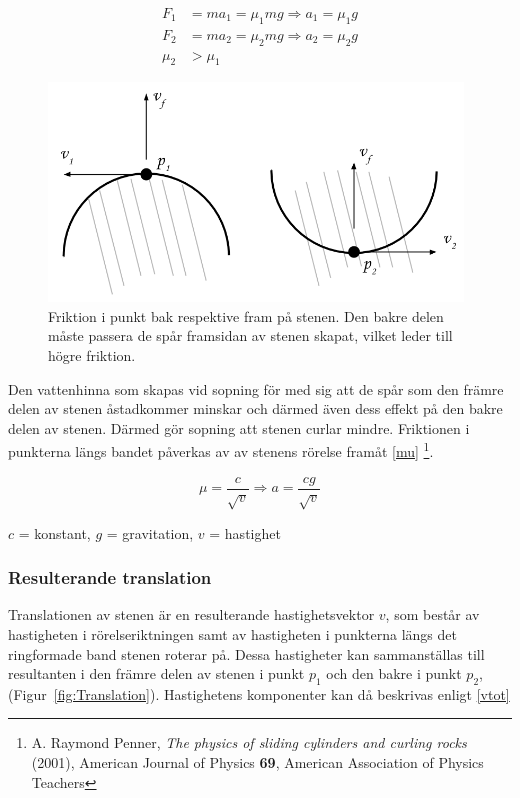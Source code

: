 \documentclass[11pt]{article} %
\begin{document}
 \begin{align}\label{Fsida1}
 F_1& = ma_1 = \mu_1 mg \Rightarrow a_1 = \mu_1 g \\\label{Fsida2}
 F_2& = ma_2 = \mu_2 mg \Rightarrow a_2 = \mu_2g \\\label{biggerthan}
 \mu_2& > \mu_1
 \end{align}

\begin{figure}[ht!]
\centering
\includegraphics[width=110mm]{Friktion_bakfram.png}
\caption{Friktion i punkt bak respektive fram på stenen. Den bakre delen måste passera de spår framsidan av stenen skapat, vilket leder till högre friktion.}
\label{fig:Friktion}
\label{overflow}
\end{figure}

Den vattenhinna som skapas vid sopning för med sig att de spår som den främre delen av stenen åstadkommer minskar och därmed  även dess effekt på den bakre delen av stenen. Därmed gör sopning att stenen curlar mindre. Friktionen i punkterna längs bandet påverkas av av stenens rörelse framåt \eqref{mu}
\footnote{A. Raymond Penner, \emph{The physics of sliding cylinders and curling rocks} (2001), American Journal of Physics \textbf{69}, American Association of Physics Teachers}.


\begin{equation}\label{mu} 
\mu = \frac{c}{\sqrt{v}} \Rightarrow a = \frac{cg}{\sqrt{v}} 
\end{equation}

$c$ = konstant, $g$ = gravitation, $v$ = hastighet

\subsubsection{Resulterande translation}

Translationen av stenen är en resulterande hastighetsvektor $v$, som består av hastigheten i rörelseriktningen samt av hastigheten i punkterna längs det ringformade band stenen roterar på. Dessa hastigheter kan sammanställas till resultanten i den främre delen av stenen i punkt $p_1$ och den bakre i punkt $p_2$, (Figur~\ref{fig:Translation}). Hastighetens komponenter kan då beskrivas enligt \eqref{vtot}
\end{document}
